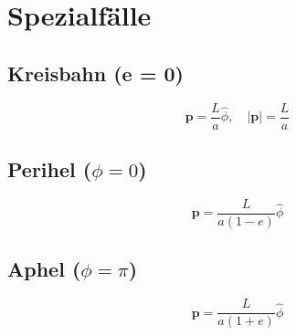 \section{Spezialfälle}
\subsection{Kreisbahn (e = 0)}
\[
\mathbf{p} = \frac{L}{a} \hat{\phi}, \quad |\mathbf{p}| = \frac{L}{a}
\]

\subsection{Perihel ($\phi = 0$)}
\[
\mathbf{p} = \frac{L}{a(1 - e)} \hat{\phi}
\]

\subsection{Aphel ($\phi = \pi$)}
\[
\mathbf{p} = \frac{L}{a(1 + e)} \hat{\phi}
\]